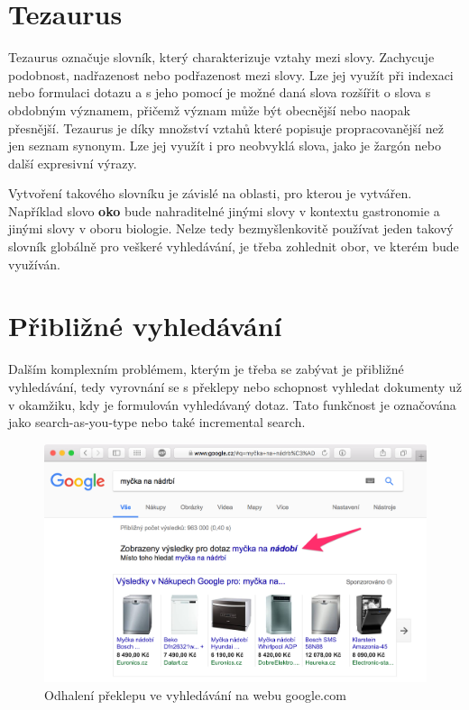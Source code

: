 \documentclass[FM,DP]{tulthesis}
\begin{document}
\section{Tezaurus}

Tezaurus označuje slovník, který charakterizuje vztahy mezi slovy. Zachycuje podobnost, 
nadřazenost nebo podřazenost mezi slovy. Lze jej využít při indexaci nebo formulaci 
dotazu a s jeho pomocí je možné daná slova rozšířit o slova s obdobným významem, 
přičemž význam může být obecnější nebo naopak přesnější. Tezaurus je díky množství
vztahů které popisuje propracovanější než jen seznam synonym. Lze jej využít 
i pro neobvyklá slova, jako je žargón nebo další expresivní výrazy.

Vytvoření takového slovníku je závislé na oblasti, pro kterou je vytvářen. Například 
slovo \textbf{oko} bude nahraditelné jinými slovy v kontextu gastronomie a jinými 
slovy v oboru biologie. Nelze tedy bezmyšlenkovitě používat jeden takový slovník globálně 
pro veškeré vyhledávání, je třeba zohlednit obor, ve kterém bude využíván.

\section{Přibližné vyhledávání}

Dalším komplexním problémem, kterým je třeba se zabývat je přibližné vyhledávání, tedy
vyrovnání se s překlepy nebo schopnost vyhledat dokumenty už v okamžiku, kdy je formulován
vyhledávaný dotaz. Tato funkčnost je označována jako search-as-you-type nebo také
incremental search.

\begin{figure}[h]
\center
\includegraphics[width=\textwidth]{google-preklep.png}
\caption{Odhalení překlepu ve vyhledávání na webu google.com}
\label{google-preklep}
\end{figure}
\end{document}
